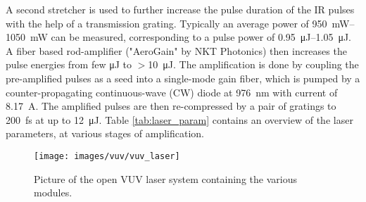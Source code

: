 A second stretcher is used to further increase the pulse duration of the IR pulses with the help of a transmission grating.
Typically an average power of \qtyrange{950}{1050}{\milli\watt} can be measured, corresponding to a pulse power of \qtyrange{0.95}{1.05}{\micro\joule}.
A fiber based rod-amplifier ("AeroGain" by NKT Photonics) then increases the pulse energies from few \unit{\micro\joule} to $>$\qty{10}{\micro\joule}.
The amplification is done by coupling the pre-amplified pulses as a seed into a single-mode gain fiber, which is pumped by a counter-propagating continuous-wave (CW) diode at \qty{976}{\nano\meter} with current of \qty{8.17}{\ampere}.
The amplified pulses are then re-compressed by a pair of gratings to \qty{200}{\femto\second} at up to \qty{12}{\micro\joule}.
Table \ref{tab:laser_param} contains an overview of the laser parameters, at various stages of amplification.

\begin{figure}
	\centering
	\texttt{[image: images/vuv/vuv\_laser]}
	\caption{Picture of the open VUV laser system containing the various modules.}
	\label{fig:vuvlaser}
\end{figure}


